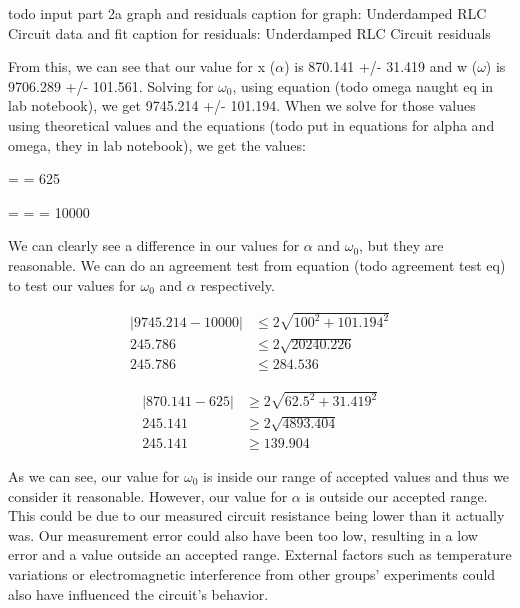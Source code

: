 \documentclass[11pt]{article}
\begin{document}
    todo input part 2a graph and residuals
    caption for graph: Underdamped RLC Circuit data and fit
    caption for residuals: Underdamped RLC Circuit residuals

    From this, we can see that our value for x (\( \alpha \)) is 870.141 +/- 31.419 and w (\( \omega \)) is 9706.289 +/- 101.561. Solving for \( \omega_0 \), using equation (todo omega naught eq in lab notebook), we get 9745.214 +/- 101.194. When we solve for those values using theoretical values and the equations (todo put in equations for alpha and omega, they in lab notebook), we get the values:
    
    \alpha =  = 625
    
    \omega =  =  = 10000


    We can clearly see a difference in our values for \( \alpha \) and \( \omega_0 \), but they are reasonable. We can do an agreement test from equation (todo agreement test eq) to test our values for \( \omega_0 \) and \( \alpha \) respectively.

    \begin{e}
        \begin{align*}
            |9745.214 - 10000| &\le 2 \sqrt{100^2 + 101.194^2} \\
            245.786 &\le 2 \sqrt{20240.226} \\
            245.786 &\le 284.536
        \end{align*}
    \end{e}
    \begin{e}
        \begin{align*}
            |870.141 - 625| &\ge 2 \sqrt{62.5^2 + 31.419^2} \\
            245.141 &\ge 2 \sqrt{4893.404} \\
            245.141 &\ge 139.904
        \end{align*}
    \end{e}

    As we can see, our value for \( \omega_0 \) is inside our range of accepted values and thus we consider it reasonable. However, our value for \( \alpha \) is outside our accepted range. This could be due to our measured circuit resistance being lower than it actually was. Our measurement error could also have been too low, resulting in a low error and a value outside an accepted range. External factors such as temperature variations or electromagnetic interference from other groups' experiments could also have influenced the circuit's behavior.
\end{document}
